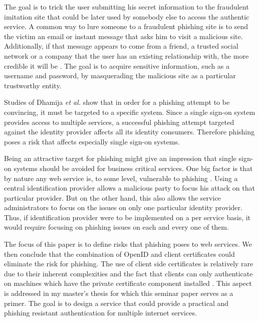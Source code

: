 \documentclass[english,gradu]{tktltiki}
\begin{document}
    The goal is to trick the user submitting his secret information to the fraudulent imitation site that could be later used by somebody else to access the authentic service. A common way to lure someone to a fraudulent phishing site is to send the victim an email or instant message that asks him to visit a malicious site. Additionally, if that message appears to come from a friend, a trusted social network or a company that the user has an existing relationship with, the more credible it will be \cite{suspectibility_to_phishing_2006}. The goal is to acquire sensitive information, such as a username and password, by masquerading the malicious site as a particular trustworthy entity.

    Studies of Dhamija \emph{et al.} \cite{why_phishing_works_06} show that in order for a phishing attempt to be convincing, it must be targeted to a specific system. Since a single sign-on system provides access to multiple services, a successful phishing attempt targeted against the identity provider affects all its identity consumers. Therefore phishing poses a risk that affects especially single sign-on systems.

    Being an attractive target for phishing might give an impression that single sign-on systems should be avoided for business critical services. One big factor is that by nature any web service is, to some level, vulnerable to phishing \cite{why_phishing_works_06}. Using a central identification provider allows a malicious party to focus his attack on that particular provider. But on the other hand, this also allows the service administrators to focus on the issues on only one particular identity provider. Thus, if identification provider were to be implemented on a per service basis, it would require focusing on phishing issues on each and every one of them.

    The focus of this paper is to define risks that phishing poses to web services. We then conclude that the combination of OpenID and client certificates could eliminate the risk for phishing. The use of client side certificates is relatively rare due to their inherent complexities and the fact that clients can only authenticate on machines which have the private certificate component installed \cite{owasp_tls_cheatsheet}. This aspect is addressed in my master's thesis for which this seminar paper serves as a primer. The goal is to design a service that could provide a practical and phishing resistant authentication for multiple internet services.
\end{document}
